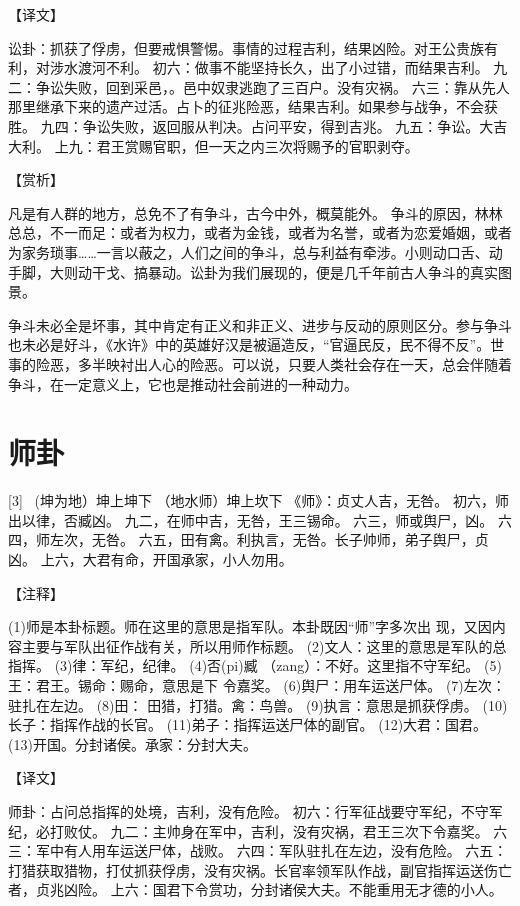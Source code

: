 \documentclass[12pt,UTF8]{ctexbook}
\begin{document}
【译文】

讼卦：抓获了俘虏，但要戒惧警惕。事情的过程吉利，结果凶险。对王公贵族有利，对涉水渡河不利。
初六：做事不能坚持长久，出了小过错，而结果吉利。
九二：争讼失败，回到采邑，。邑中奴隶逃跑了三百户。没有灾祸。
六三：靠从先人那里继承下来的遗产过活。占卜的征兆险恶，结果吉利。如果参与战争，不会获胜。
九四：争讼失败，返回服从判决。占问平安，得到吉兆。
九五：争讼。大吉大利。
上九：君王赏赐官职，但一天之内三次将赐予的官职剥夺。

【赏析】

凡是有人群的地方，总免不了有争斗，古今中外，概莫能外。 争斗的原因，林林总总，不一而足：或者为权力，或者为金钱，或者为名誉，或者为恋爱婚姻，或者为家务琐事……一言以蔽之，人们之间的争斗，总与利益有牵涉。小则动口舌、动手脚，大则动干戈、搞暴动。讼卦为我们展现的，便是几千年前古人争斗的真实图景。

争斗未必全是坏事，其中肯定有正义和非正义、进步与反动的原则区分。参与争斗也未必是好斗，《水许》中的英雄好汉是被逼造反，“官逼民反，民不得不反”。世事的险恶，多半映衬出人心的险恶。可以说，只要人类社会存在一天，总会伴随着争斗，在一定意义上，它也是推动社会前进的一种动力。

\chapter{师卦}
[3] \ (坤为地）坤上坤下
（地水师）坤上坎下
《师》：贞丈人吉，无咎。
初六，师出以律，否臧凶。
九二，在师中吉，无咎，王三锡命。
六三，师或舆尸，凶。
六四，师左次，无咎。
六五，田有禽。利执言，无咎。长子帅师，弟子舆尸，贞凶。
上六，大君有命，开国承家，小人勿用。

【注释】

(1)师是本卦标题。师在这里的意思是指军队。本卦既因“师”字多次出 现，又因内容主要与军队出征作战有关，所以用师作标题。
(2)文人：这里的意思是军队的总指挥。
(3)律：军纪，纪律。
(4)否(pi)臧 （zang）：不好。这里指不守军纪。
(5)王：君王。锡命：赐命，意思是下 令嘉奖。
(6)舆尸：用车运送尸体。
(7)左次：驻扎在左边。
(8)田： 田猎，打猎。禽：鸟兽。
(9)执言：意思是抓获俘虏。
(10)长子：指挥作战的长官。
(11)弟子：指挥运送尸体的副官。
(12)大君：国君。
(13)开国。分封诸侯。承家：分封大夫。

【译文】

师卦：占问总指挥的处境，吉利，没有危险。
初六：行军征战要守军纪，不守军纪，必打败仗。
九二：主帅身在军中，吉利，没有灾祸，君王三次下令嘉奖。
六三：军中有人用车运送尸体，战败。
六四：军队驻扎在左边，没有危险。
六五：打猎获取猎物，打仗抓获俘虏，没有灾祸。长官率领军队作战，副官指挥运送伤亡者，贞兆凶险。
上六：国君下令赏功，分封诸侯大夫。不能重用无才德的小人。
\end{document}
